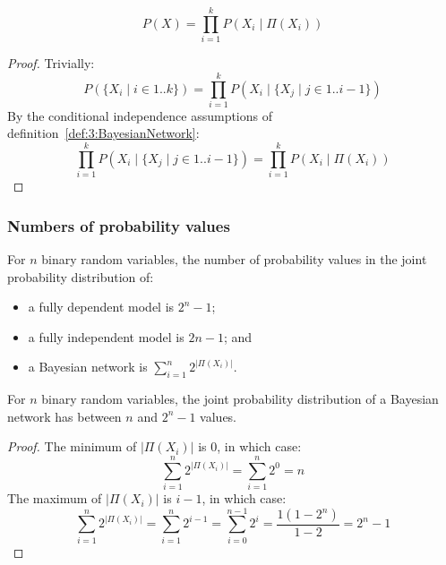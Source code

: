 \begin{thm}
  \label{thm:3:BayesianNetworkJPD}
  \begin{equation}
    P(X) = \prod_{i = 1}^{k} P(X_i \mid \Pi(X_i))
  \end{equation}
  \begin{proof}
    Trivially:
    \begin{equation}
      P(\{ X_i \mid i \in 1 .. k \})
      = \prod_{i = 1}^{k} P(X_i \mid \{ X_j \mid j \in 1 .. i - 1 \})
    \end{equation}
    By the conditional independence assumptions of
    definition~\ref{def:3:BayesianNetwork}:
    \begin{equation}
      \prod_{i = 1}^{k} P(X_i \mid \{ X_j \mid j \in 1 .. i - 1 \})
      = \prod_{i = 1}^{k} P(X_i \mid \Pi(X_i))
    \end{equation}
  \end{proof}
\end{thm}

\subsubsection{Numbers of probability values}

For $n$ binary random variables, the number of probability values in the joint
probability distribution of:
\begin{itemize}
  \item a fully dependent model is $2^n - 1$;
  \item a fully independent model is $2n - 1$; and
  \item a Bayesian network is $\sum_{i = 1}^{n} 2^{|\Pi(X_i)|}$.
\end{itemize}

\begin{thm}
  For $n$ binary random variables, the joint probability distribution of a
  Bayesian network has between $n$ and $2^n - 1$ values.
  \begin{proof}
    The minimum of $|\Pi(X_i)|$ is 0, in which case:
    \begin{equation}
      \sum_{i = 1}^{n} 2^{|\Pi(X_i)|} = \sum_{i = 1}^{n} 2^0 = n
    \end{equation}
    The maximum of $|\Pi(X_i)|$ is $i - 1$, in which case:
    \begin{equation}
      \sum_{i = 1}^{n} 2^{|\Pi(X_i)|}
      = \sum_{i = 1}^{n} 2^{i - 1}
      = \sum_{i = 0}^{n - 1} 2^i
      = \frac{1 (1 - 2^n)}{1 - 2}
      = 2^n - 1
    \end{equation}
  \end{proof}
\end{thm}

